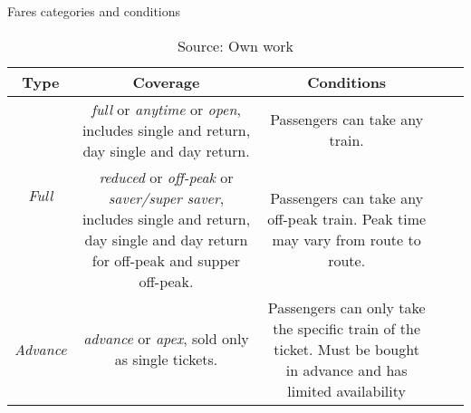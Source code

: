 
\begin{table}
 \centering 
  \caption{Fares categories and conditions} 
  \label{tbl:fares-general} 
{\renewcommand\arraystretch{1.25}}
\begin{tabular} {ccccccc}
\toprule
Type & \multicolumn{2}{c}{Coverage} & \multicolumn{2}{c}{Conditions}\\ 
\hline
\multirow{2}{*}{\textit{Full}}    & \multicolumn{2}{p{6cm}}{\raggedright \textit{full} or \textit{anytime} or \textit{open}, includes single and return, day single and day return.} & \multicolumn{2}{p{6cm}}{\raggedright Passengers can take any train.}\\
\hline
\multirow{2}{*}{\textit{Reduced}} &  \multicolumn{2}{p{6cm}}{\raggedright \textit{reduced} or \textit{off-peak} or \textit{saver/super saver}, includes single and return, day single and day return for off-peak and supper off-peak.} & \multicolumn{2}{p{6cm}}{\raggedright Passengers can take any off-peak train. Peak time may vary from route to route.}\\
\hline
\multirow{2}{*}{\textit{Advance}} & \multicolumn{2}{p{6cm}}{\raggedright \textit{advance} or \textit{apex}, sold only as single tickets.} & \multicolumn{2}{p{6cm}}{\raggedright Passengers can only take the specific train of the ticket. Must be bought in advance and has limited availability}\\
\bottomrule
\end{tabular}%
\caption*{Source: Own work}
\end{table} 

